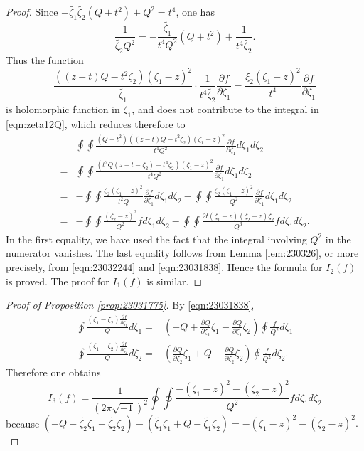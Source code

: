 \documentclass[12pt,leqno]{amsart}
\theoremstyle{plain}
\theoremstyle{definition}
\begin{document}
\begin{proof}
Since 
$
   -\widetilde{\zeta_1} \widetilde{\zeta_2} (Q+t^2)+Q^2
   =t^4
$, 
 one has
\[
   \frac{1}{\widetilde{\zeta_2}Q^2}
  =-\frac{\widetilde{\zeta_1}}{t^4 Q^2}(Q+t^2)
   + \frac 1 {t^4\widetilde{\zeta_2}}.  
\]
Thus the function 
\[
  \frac{((z-t)Q-t^2\zeta_2)(\zeta_1-z)^2}{\widetilde{\zeta_1}}\cdot \frac 1 {t^4\widetilde{\zeta_2}} \frac{\partial f}{\partial \zeta_1}
  =
  \frac{\xi_2(\zeta_1-z)^2}{t^4}\frac{\partial f}{\partial \zeta_1}
\]
 is holomorphic function in $\zeta_1$, 
 and does not contribute
 to the integral in \eqref{eqn:zeta12Q}, 
 which reduces therefore to 
\begin{align*}
  &\oint \oint \frac{(Q+t^2)((z-t)Q-t^2\zeta_2)(\zeta_1-z)^2}{t^4 Q^2}
               \frac{\partial f}{\partial \zeta_1} 
               d \zeta_1 d \zeta_2
\\
   =
   & \oint \oint \frac{(t^2 Q (z-t-\zeta_2)-t^4 \zeta_2)(\zeta_1-z)^2}
                     {t^4 Q^2}
   \frac{\partial f}{\partial \zeta_1}
   d \zeta_1 d \zeta_2
\\
   =
   & -\oint \oint \frac{\widetilde{\zeta_2}(\zeta_1-z)^2}{t^2 Q} 
                 \frac{\partial f}{\partial \zeta_1} d \zeta_1 d \zeta_2
   - \oint \oint \frac{\zeta_2 (\zeta_1-z)^2}{Q^2} 
                 \frac{\partial f}{\partial \zeta_1} d \zeta_1 d \zeta_2
\\
   =
   &- \oint \oint \frac{(\zeta_2-z)^2}{Q^2} 
                 f d \zeta_1 d \zeta_2
   - \oint \oint \frac{2 t (\zeta_1-z)(\zeta_2-z)\zeta_2}{Q^3} 
                 f d \zeta_1 d \zeta_2.  
\end{align*}
In the first equality, 
 we have used the fact
 that the integral involving $Q^2$ 
 in the numerator vanishes.  
The last equality follows from Lemma \ref{lem:230326}, 
 or more precisely, from \eqref{eqn:23032244} and \eqref{eqn:23031838}.  
Hence the formula for $I_2(f)$ is proved.  
The proof for $I_1(f)$ is similar.  
\end{proof}

\begin{proof}
[Proof of Proposition \ref{prop:23031775}]
By \eqref{eqn:23031838}, 
\begin{align*}
\oint \frac{(\zeta_1-\zeta_2)\frac{\partial f}{\partial \zeta_1}} Q d \zeta_1 
=& (-Q+ \frac{\partial Q}{\partial \zeta_1} \zeta_1 - \frac{\partial Q}{\partial \zeta_1} \zeta_2)
\oint \frac f {Q^2} d \zeta_1
\\
\oint \frac{(\zeta_1-\zeta_2)\frac{\partial f}{\partial \zeta_2}} Q d \zeta_2 
=& (\frac{\partial Q}{\partial \zeta_2} \zeta_1 + Q - \frac{\partial Q}{\partial \zeta_2} \zeta_2)
\oint \frac f {Q^2} d \zeta_2.  
\end{align*}
Therefore one obtains 
\begin{equation*}
I_3(f)
=\frac{1}{(2 \pi \sqrt{-1})^2} 
  \oint\oint \frac{- (\zeta_1-z)^2-(\zeta_2-z)^2}{Q^2} f d \zeta_1 d \zeta_2
\end{equation*}
because 
$
  (-Q+\widetilde{\zeta_2} \zeta_1-\widetilde{\zeta_2}\zeta_2)
  -
  (\widetilde{\zeta_1} \zeta_1 + Q -\widetilde{\zeta_1}\zeta_2)
=
  - ({\zeta_1}-z)^2 -({\zeta_2}-z)^2.  
$

\end{proof}
\end{document}
